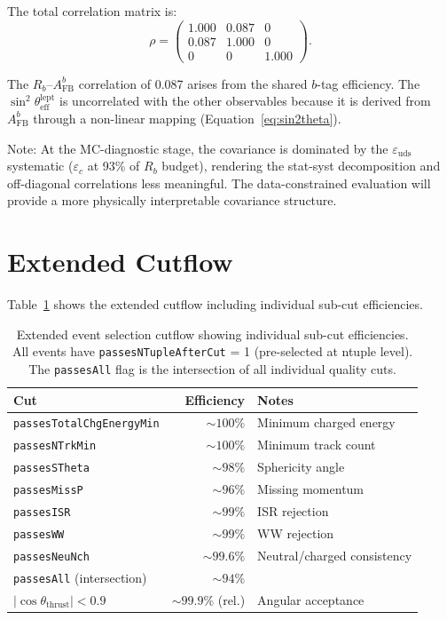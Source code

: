 \documentclass[11pt,a4paper]{article}
\begin{document}
The total correlation matrix is:
\begin{equation}
\rho = \begin{pmatrix}
1.000 & 0.087 & 0 \\
0.087 & 1.000 & 0 \\
0 & 0 & 1.000
\end{pmatrix}.
\label{eq:correlation}
\end{equation}

The $R_b$--$A_\mathrm{FB}^b$ correlation of 0.087 arises from the shared $b$-tag
efficiency. The $\sin^2\theta_\mathrm{eff}^\mathrm{lept}$ is uncorrelated with the
other observables because it is derived from $A_\mathrm{FB}^b$ through a non-linear
mapping (Equation~\ref{eq:sin2theta}).

Note: At the MC-diagnostic stage, the covariance is dominated by the $\varepsilon_\mathrm{uds}$
systematic ($\varepsilon_c$ at 93\% of $R_b$ budget), rendering the stat-syst decomposition and
off-diagonal correlations less meaningful. The data-constrained evaluation will provide a more
physically interpretable covariance structure.

\section{Extended Cutflow}
\label{app:cutflow}

Table~\ref{tab:extended_cutflow} shows the extended cutflow including individual
sub-cut efficiencies.

\begin{table}[htbp]
\centering
\caption{Extended event selection cutflow showing individual sub-cut efficiencies.
All events have \texttt{passesNTupleAfterCut} = 1 (pre-selected at ntuple level).
The \texttt{passesAll} flag is the intersection of all individual quality cuts.}
\label{tab:extended_cutflow}
\begin{tabular}{lrl}
\toprule
Cut & Efficiency & Notes \\
\midrule
\texttt{passesTotalChgEnergyMin} & $\sim 100\%$ & Minimum charged energy \\
\texttt{passesNTrkMin} & $\sim 100\%$ & Minimum track count \\
\texttt{passesSTheta} & $\sim 98\%$ & Sphericity angle \\
\texttt{passesMissP} & $\sim 96\%$ & Missing momentum \\
\texttt{passesISR} & $\sim 99\%$ & ISR rejection \\
\texttt{passesWW} & $\sim 99\%$ & WW rejection \\
\texttt{passesNeuNch} & $\sim 99.6\%$ & Neutral/charged consistency \\
\texttt{passesAll} (intersection) & $\sim 94\%$ & \\
$|\cos\theta_\mathrm{thrust}| < 0.9$ & $\sim 99.9\%$ (rel.) & Angular acceptance \\
\bottomrule
\end{tabular}
\end{table}
\end{document}
